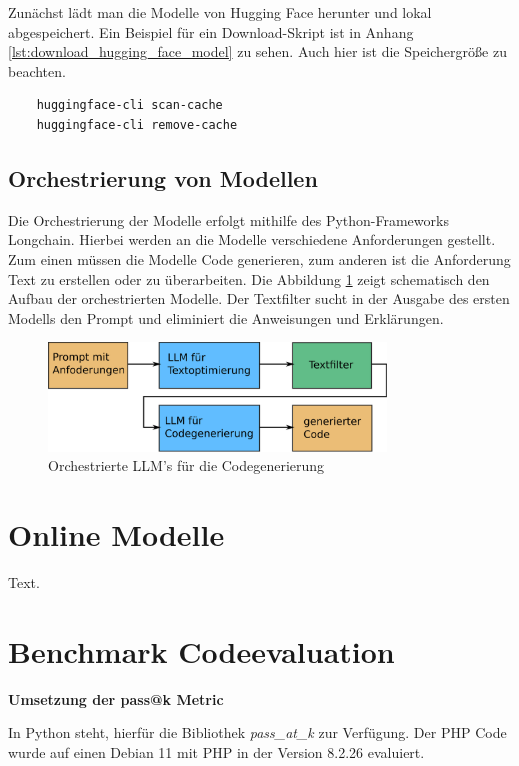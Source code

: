 Zunächst lädt man die Modelle von Hugging Face herunter und lokal abgespeichert. Ein Beispiel für ein Download-Skript ist in Anhang \ref{lst:download_hugging_face_model} zu sehen. Auch hier ist die Speichergröße zu beachten.

\begin{verbatim}
	huggingface-cli scan-cache
	huggingface-cli remove-cache
\end{verbatim}

\subsection{Orchestrierung von Modellen}
Die Orchestrierung der Modelle erfolgt mithilfe des Python-Frameworks Longchain. Hierbei werden an die Modelle verschiedene Anforderungen gestellt. Zum einen müssen die Modelle Code generieren, zum anderen ist die Anforderung Text zu erstellen oder zu überarbeiten. Die Abbildung \ref{img:orchestration_llms} zeigt schematisch den Aufbau der orchestrierten Modelle. Der Textfilter sucht in der Ausgabe des ersten Modells den Prompt und eliminiert die Anweisungen und Erklärungen.

\begin{figure}[!ht]
	\includegraphics[width=0.8\textwidth]{content/chapter_implementation/images/orchestrierung_llms.eps}
	\centering
	\caption{Orchestrierte LLM's für die Codegenerierung}
	\label{img:orchestration_llms}
\end{figure}

\section{Online Modelle}
Text.

\section{Benchmark Codeevaluation}\label{sec:benchmark_evaluation}

\textbf{Umsetzung der pass@k Metric}\vspace{0.2cm}

In Python steht, hierfür die Bibliothek \textit{pass\_at\_k} zur Verfügung. Der PHP Code wurde auf einen Debian 11 mit PHP in der Version 8.2.26 evaluiert.

